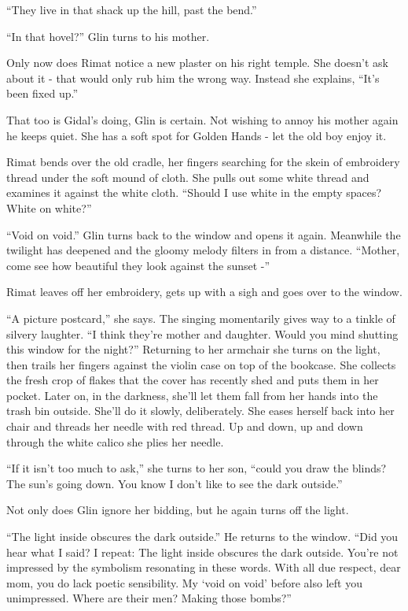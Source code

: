 \documentclass[twoside,11pt]{book}
\begin{document}
``They live in that shack up the hill,
past the bend.''

``In that hovel?'' Glin turns to his
mother.

Only now does Rimat notice a new plaster
on his right temple. She doesn't ask about
it - that would only rub him the wrong
way. Instead she explains, ``It's been fixed up.''

That too is Gidal's doing, Glin is certain. Not wishing to annoy his
mother again he keeps quiet. She has a soft spot for Golden Hands -
let the old boy enjoy it.

Rimat bends over the old cradle, her fingers searching for the
skein of embroidery thread under the soft mound of cloth. She pulls
out some white thread and examines it against the white cloth.
``Should I use white in the empty spaces? White on white?''

``Void on void.'' Glin turns back to the window and opens it
again. Meanwhile the twilight has deepened and the gloomy melody
filters in from a distance. ``Mother, come see how beautiful they look
against the sunset -''

Rimat leaves off her embroidery, gets up with a sigh and goes over to
the window.

``A picture postcard,'' she says. The singing momentarily gives way
to a tinkle of silvery laughter. ``I think they're mother and daughter. Would you mind shutting this window for the
night?'' Returning
to her armchair she turns on the light, then trails her fingers
against the violin case on top
of the bookcase. She
collects the fresh crop of flakes that the cover has recently shed and
puts them in her pocket. Later on, in the darkness,
she'll let them fall from her hands into the trash bin
outside. She'll do it slowly, deliberately. She eases herself back
into her chair and threads her needle with red thread. Up and down, up and down through the white calico she
plies her needle.

``If it isn't
too much to ask,'' she turns to her son,
``could you draw the blinds? The sun's going
down. You know I don't like to see the dark
outside.''

Not only does Glin
ignore her bidding, but he again turns off the light.

``The light inside obscures
the dark outside.'' He returns to the window. ``Did you hear what I
said? I repeat: The light
inside obscures the dark outside. You're not impressed by the
symbolism resonating in these words. With all due respect, dear mom,
you do lack poetic sensibility. My `void on void' before also left
you unimpressed. Where are their men?
Making those bombs?''
\end{document}
